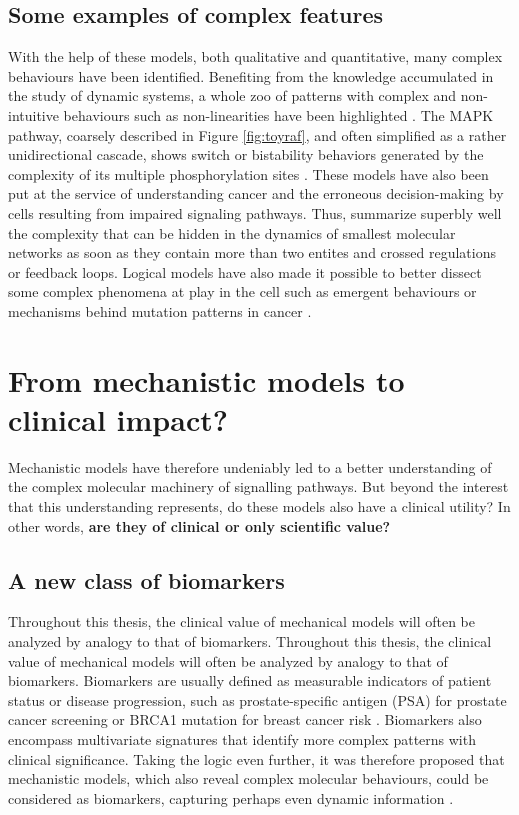 \documentclass[a4paper,12pt,twoside,onecolumn,openright,final,oldfontcommands]{memoir}
\begin{document}
\subsection{Some examples of complex
features}\label{some-examples-of-complex-features}

With the help of these models, both qualitative and quantitative, many
complex behaviours have been identified. Benefiting from the knowledge
accumulated in the study of dynamic systems, a whole zoo of patterns
with complex and non-intuitive behaviours such as non-linearities have
been highlighted \citep{tyson2003sniffers}. The MAPK pathway, coarsely
described in Figure \ref{fig:toyraf}, and often simplified as a rather
unidirectional cascade, shows switch or bistability behaviors generated
by the complexity of its multiple phosphorylation sites
\citep{markevich2004signaling}. These models have also been put at the
service of understanding cancer and the erroneous decision-making by
cells resulting from impaired signaling pathways. Thus,
\citet{tyson2011dynamic} summarize superbly well the complexity that can
be hidden in the dynamics of smallest molecular networks as soon as they
contain more than two entites and crossed regulations or feedback loops.
Logical models have also made it possible to better dissect some complex
phenomena at play in the cell such as emergent behaviours
\citep{helikar2008emergent} or mechanisms behind mutation patterns in
cancer \citep{remy2015modeling}.

\section{From mechanistic models to clinical
impact?}\label{from-mechanistic-models-to-clinical-impact}

Mechanistic models have therefore undeniably led to a better
understanding of the complex molecular machinery of signalling pathways.
But beyond the interest that this understanding represents, do these
models also have a clinical utility? In other words, \textbf{are they of
clinical or only scientific value?}

\subsection{A new class of biomarkers}\label{a-new-class-of-biomarkers}

Throughout this thesis, the clinical value of mechanical models will
often be analyzed by analogy to that of biomarkers. Throughout this
thesis, the clinical value of mechanical models will often be analyzed
by analogy to that of biomarkers. Biomarkers are usually defined as
measurable indicators of patient status or disease progression, such as
prostate-specific antigen (PSA) for prostate cancer screening or BRCA1
mutation for breast cancer risk \citep{henry2012cancer}. Biomarkers also
encompass multivariate signatures that identify more complex patterns
with clinical significance. Taking the logic even further, it was
therefore proposed that mechanistic models, which also reveal complex
molecular behaviours, could be considered as biomarkers, capturing
perhaps even dynamic information \citep{fey2015signaling}.
\end{document}

